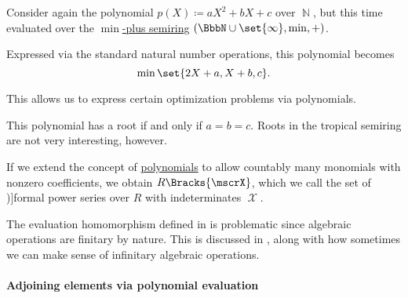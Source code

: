 \begin{example}
\begin{thmenum}
     Consider again the polynomial \( p(X) \coloneqq aX^2 + bX + c \) over \( \BbbN \), but this time evaluated over the \hyperref[def:tropical_semiring]{\( \min \)-plus semiring} \( (\BbbN \cup \set{ \infty }, \min, +) \).

    Expressed via the standard natural number operations, this polynomial becomes
    \begin{equation*}
      \min\set{ 2X + a, X + b, c }.
    \end{equation*}

    This allows us to express certain optimization problems via polynomials.

    This polynomial has a root if and only if \( a = b = c \). Roots in the tropical semiring are not very interesting, however.
  \end{thmenum}
\end{example}

\begin{definition}\label{def:formal_power_series}
  If we extend the concept of \hyperref[def:polynomial_algebra]{polynomials} to allow countably many monomials with nonzero coefficients, we obtain \( R\Bracks{\mscrX} \), which we call the set of \term[ru=формальные степянные ряды (\cite[28]{Шафаревич1999})]{formal power series} over \( R \) with indeterminates \( \mscrX \).
\end{definition}
\begin{comments}
  \item The evaluation homomorphism defined in  is problematic since algebraic operations are finitary by nature. This is discussed in , along with how sometimes we can make sense of infinitary algebraic operations.
\end{comments}

\paragraph{Adjoining elements via polynomial evaluation}


